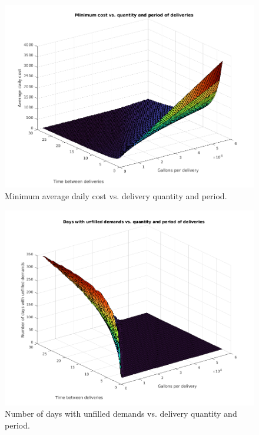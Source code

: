 \documentclass{article}
\begin{document}
    \begin{figure}[h]
        \centering
        \includegraphics[width=\textwidth]{surface1.png}
        \caption{Minimum average daily cost vs. delivery quantity and period.}
        \label{fig:surface1}
    \end{figure}

    \begin{figure}[p]
        \centering
        \includegraphics[width=\textwidth]{surface2.png}
        \caption{Number of days with unfilled demands vs. delivery quantity and period.}
        \label{fig:surface2}
    \end{figure}
\end{document}
